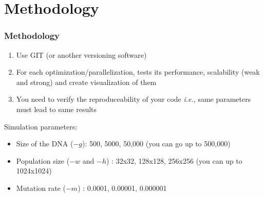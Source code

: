 \documentclass{beamer}
\begin{document}
\section{Methodology}
\begin{frame}
 \frametitle{Methodology}
\begin{enumerate}
 \item Use GIT (or another versioning software)
 \item For each optimization/parallelization, tests its performance, scalability (weak and strong) and create visualization of them
 \item You need to verify the reproduceability of your code \textit{i.e.}, same parameters must lead to same results
\end{enumerate}
\vfill
Simulation parameters:
\begin{itemize}
 \item Size of the DNA ($-g$): 500, 5000, 50,000 (you can go up to 500,000)
 \item Population size ($-w$ and $-h$) : 32x32, 128x128, 256x256 (you can up to 1024x1024)
 \item Mutation rate ($-m$) : 0.0001, 0.00001, 0.000001
\end{itemize}


 \end{frame}
\end{document}
